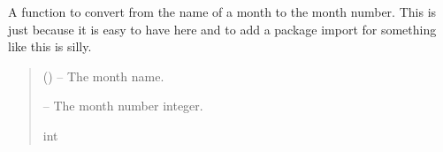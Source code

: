 \documentclass[letterpaper,11pt,english]{sphinxmanual}
\begin{document}

\begin{savenotes}\begin{fulllineitems}
\label{\detokenize{code/opihiexarata.library.conversion:opihiexarata.library.conversion.string_month_to_number}}
\pysigstartsignatures
{}
\pysigstopsignatures
\sphinxAtStartPar
A function to convert from the name of a month to the month number.
This is just because it is easy to have here and to add a package import
for something like this is silly.
\begin{quote}\begin{description}
\sphinxAtStartPar
{} () – The month name.

\sphinxAtStartPar
{} – The month number integer.

\sphinxAtStartPar
int

\end{description}\end{quote}

\end{fulllineitems}\end{savenotes}

\end{document}
